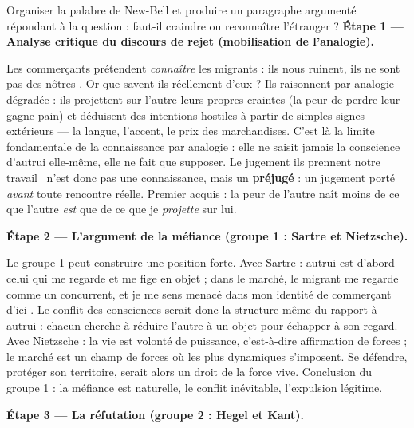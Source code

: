 \documentclass[11pt]{article}
\newcommand{\cle}[1]{{\popxbold\color{popdark}#1}}
\begin{document}
\begin{exoresolu}
Organiser la palabre de New-Bell et produire un paragraphe argumenté répondant à la question : faut-il craindre ou reconnaître l'étranger ?
\tcblower
\textbf{Étape 1 — Analyse critique du discours de rejet (mobilisation de l'analogie).}\par
Les commerçants prétendent \emph{connaître} les migrants : \guillemotleft ils nous ruinent, ils ne sont pas des nôtres \guillemotright. Or que savent-ils réellement d'eux ? Ils raisonnent par \cle{analogie} dégradée : ils projettent sur l'autre leurs propres craintes (la peur de perdre leur gagne-pain) et déduisent des intentions hostiles à partir de simples signes extérieurs — la langue, l'accent, le prix des marchandises. C'est là la limite fondamentale de la connaissance par analogie : elle ne saisit jamais la conscience d'autrui elle-même, elle ne fait que supposer. Le jugement \guillemotleft ils prennent notre travail \guillemotright\ n'est donc pas une connaissance, mais un \textbf{préjugé} : un jugement porté \emph{avant} toute rencontre réelle. Premier acquis : la peur de l'autre naît moins de ce que l'autre \emph{est} que de ce que je \emph{projette} sur lui.\par
\textbf{Étape 2 — L'argument de la méfiance (groupe 1 : Sartre et Nietzsche).}\par
Le groupe 1 peut construire une position forte. Avec Sartre : autrui est d'abord celui qui me regarde et me fige en objet ; dans le marché, le migrant me regarde comme un concurrent, et je me sens menacé dans mon identité de commerçant \guillemotleft d'ici \guillemotright. Le conflit des consciences serait donc la structure même du rapport à autrui : chacun cherche à réduire l'autre à un objet pour échapper à son regard. Avec Nietzsche : la vie est volonté de puissance, c'est-à-dire affirmation de forces ; le marché est un champ de forces où les plus dynamiques s'imposent. Se défendre, protéger son territoire, serait alors un droit de la force vive. Conclusion du groupe 1 : la méfiance est naturelle, le conflit inévitable, l'expulsion légitime.\par
\textbf{Étape 3 — La réfutation (groupe 2 : Hegel et Kant).}\par

\end{exoresolu}
\end{document}
